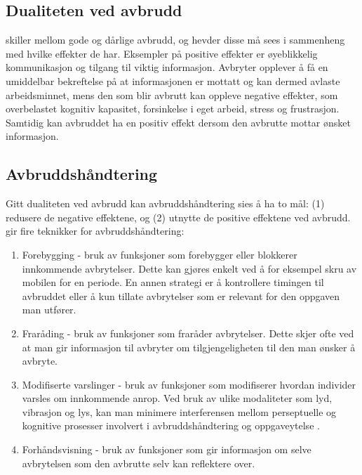 \subsection{Dualiteten ved avbrudd}
\label{sec:dualitet}
\citet{Grundgeiger09} skiller mellom gode og dårlige avbrudd, og hevder disse må sees i sammenheng med hvilke effekter de har. Eksempler på positive effekter er øyeblikkelig kommunikasjon og tilgang til viktig informasjon. Avbryter opplever å få en umiddelbar bekreftelse på at informasjonen er mottatt og kan dermed avlaste arbeidsminnet, mens den som blir avbrutt kan oppleve negative effekter, som overbelastet kognitiv kapasitet, forsinkelse i eget arbeid, stress og frustrasjon. Samtidig kan avbruddet ha en positiv effekt dersom den avbrutte mottar ønsket informasjon.

\subsection{Avbruddshåndtering}
Gitt dualiteten ved avbrudd kan avbruddshåndtering sies å ha to mål: (1) redusere de negative effektene, og (2) utnytte de positive effektene ved avbrudd. \citet{Grandhi10} gir fire teknikker for avbruddshåndtering:
\begin{enumerate}        
\item Forebygging - bruk av funksjoner som forebygger eller blokkerer innkommende avbrytelser. Dette kan gjøres enkelt ved å for eksempel skru av mobilen for en periode. En annen strategi er å kontrollere timingen til avbruddet eller å kun tillate avbrytelser som er relevant for den oppgaven man utfører.

\item Fraråding - bruk av funksjoner som fraråder avbrytelser. Dette skjer ofte ved at man gir informasjon til avbryter om tilgjengeligheten til den man ønsker å avbryte. 

\item Modifiserte varslinger - bruk av funksjoner som modifiserer hvordan individer varsles om innkommende anrop. Ved bruk av ulike modaliteter som lyd, vibrasjon og lys, kan man minimere interferensen mellom perseptuelle og kognitive prosesser involvert i avbruddshåndtering og oppgaveytelse \citep{Harr07}.

\item Forhåndsvisning - bruk av funksjoner som gir informasjon om selve avbrytelsen som den avbrutte selv kan reflektere over.   
\end{enumerate}


